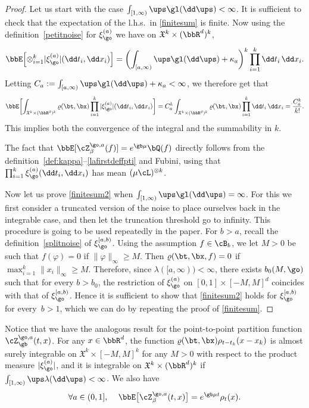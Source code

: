 \begin{proof}

Let us start with the case
$\int_{[1,\infty)} \ups \gl(\dd \ups) <\infty$.
It is sufficient to check that the expectation of the l.h.s.\ in \eqref{finitesum} is finite.
Now using the definition~\eqref{petitnoise} for $\xi_{\go}^{(a)}$ we have on $\mathfrak{X}^k\times (\bbR^d)^k$,
\[
\bbE \Bigl[\otimes_{i=1}^k |\xi_{\go}^{(a)}|(\dd t_i,\dd x_i) \Bigr]=\biggl(\int_{[a,\infty)} \ups \gl(\dd \ups) +\kappa_a\biggr)^k\prod_{i=1}^k \dd t_i\,\dd x_i.
\]
Letting $C_a:= \int_{[a,\infty)} \ups \gl(\dd \ups) +\kappa_a <\infty$, we therefore get that
\[
\bbE \biggl[ \int_{\mathfrak{X}^k \times (\bbR^d)^k} \varrho(\bt,\bx) \prod_{i=1}^k |\xi_{\go}^{(a)}| (\dd t_i, \dd x_i) \biggr]
= C_a^k
\int_{\mathfrak{X}^k \times (\bbR^d)^k} \varrho(\bt,\bx) \prod_{i=1}^k \dd t_i\, \dd x_i = \frac{ C_a^k }{k!}.
\]
This implies both the convergence of the integral and
the summability in $k$.

The fact that $\bbE[\cZ^{\go,a}_{\beta}(f)]= e^{\gb \mu} \bQ(f)$ directly follows from the definition~\eqref{def:kappa}--\eqref{lafirstdeffpti}
and Fubini,
using that $\prod_{i=1}^k\xi_{\go}^{(a)} (\dd t_i, \dd x_i)$ has mean $(\mu \cL)^{\otimes k}$.

Now let us prove \eqref{finitesum2} when $\int_{[1,\infty)} \ups \gl(\dd \ups) =\infty$.
For this we first consider a truncated version of the noise to place ourselves back in the integrable case, and then let the truncation threshold go to infinity. This procedure is going to be used repeatedly in the paper.
For $b>a$, recall the definition~\eqref{splitnoise}
of $\xi^{[a,b)}_\go$.
Using the assumption $f\in \cB_b$, we let $M>0$ be such that $f(\varphi)=0$ if $\|\varphi\|_{\infty}\ge M$. Then $\varrho(\bt,\bx,f)=0$ if~$\max_{i=1}^k \|x_i\|_{\infty} \ge M$.
Therefore, since $\lambda([a,\infty))<\infty$, there exists $b_0(M,\go)$ such that for every $b>b_0$, the restriction of $\xi^{(a)}_{\go}$ on $[0,1]\times [-M,M]^{d}$ coincides with that of $\xi^{[a,b)}_{\go}$. Hence it is sufficient to show that \eqref{finitesum2} holds for $\xi^{[a,b)}_{\go}$ for every~$b>1$, which we can do by repeating the proof of \eqref{finitesum}.
\end{proof}

\begin{rem}
\label{rem:contiZfini}
Notice that we have the analogous result for the point-to-point partition function $\cZ_{\gb}^{\go,a} (t,x)$.
For any $x\in \bbR^d$,
the function $\varrho (\bt,\bx) \rho_{t-t_k}(x-x_k)$
is almost surely integrable on $\mathfrak{X}^k \times [-M,M]^k$ for any $M>0$
with respect to the product measure $|\xi_{\go}^{(a)}|$,
and it is integrable on $\mathfrak{X}^k \times (\bbR^d)^k$ if $\int_{[1,\infty)} \ups \lambda(\dd \ups) <\infty$.
We also have%
\begin{equation}\label{zamine}
\forall a\in (0,1], \, \quad \bbE \bigl[ \cZ^{\go,a}_{\beta}(t,x) \bigr] = e^{\gb \mu t} \rho_t(x).
\end{equation}
\end{rem}


